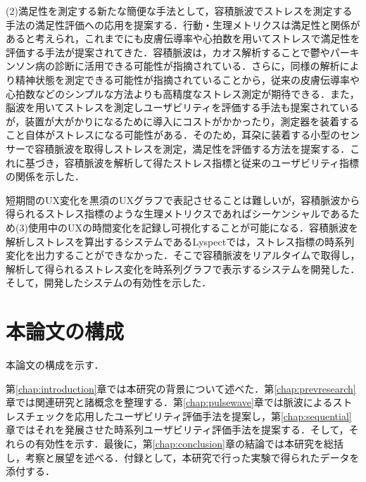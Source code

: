 (2)満足性を測定する新たな簡便な手法として，容積脈波でストレスを測定する手法の満足性評価への応用を提案する．行動・生理メトリクスは満足性と関係があると考えられ，これまでにも皮膚伝導率や心拍数を用いてストレスで満足性を評価する手法が提案されてきた．容積脈波は，カオス解析することで鬱やパーキンソン病の診断に活用できる可能性が指摘されている\cite{tuan}\cite{oyama}．さらに，同様の解析により精神状態を測定できる可能性\cite{arai}が指摘されていることから，従来の皮膚伝導率や心拍数などのシンプルな方法よりも高精度なストレス測定が期待できる．また，脳波を用いてストレスを測定しユーザビリティを評価する手法\cite{amaral}も提案されているが，装置が大がかりになるために導入にコストがかかったり，測定器を装着すること自体がストレスになる可能性がある．そのため，耳朶に装着する小型のセンサーで容積脈波を取得しストレスを測定，満足性を評価する方法を提案する．これに基づき，容積脈波を解析して得たストレス指標と従来のユーザビリティ指標の関係を示した．


短期間のUX変化を黒須のUXグラフで表記させることは難しいが，容積脈波から得られるストレス指標のような生理メトリクスであればシーケンシャルであるため(3)使用中のUXの時間変化を記録し可視化することが可能になる．容積脈波を解析しストレスを算出するシステムであるLyspect\cite{oyama2012}では，ストレス指標の時系列変化を出力することができなかった．そこで容積脈波をリアルタイムで取得し，解析して得られるストレス変化を時系列グラフで表示するシステムを開発した．そして，開発したシステムの有効性を示した．

\section{本論文の構成}

本論文の構成を示す．

第\ref{chap:introduction}章では本研究の背景について述べた．第\ref{chap:prevresearch}章では関連研究と諸概念を整理する．第\ref{chap:pulsewave}章では脈波によるストレスチェックを応用したユーザビリティ評価手法を提案し，第\ref{chap:sequential}章ではそれを発展させた時系列ユーザビリティ評価手法を提案する．そして，それらの有効性を示す．最後に，第\ref{chap:conclusion}章の結論では本研究を総括し，考察と展望を述べる．付録として，本研究で行った実験で得られたデータを添付する．
